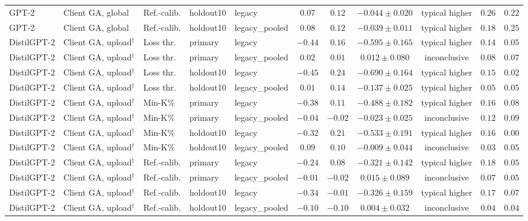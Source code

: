 \begin{table}[t]
\begin{tabular*}{\textwidth}{@{\extracolsep{\fill}}lllllcccccc@{}}
GPT-2 & Client GA, global & Ref.-calib. & holdout10 & legacy & $0.07$ & $0.12$ & $-0.044 \pm 0.020$ & typical higher & $0.26$ & $0.22$ \\
GPT-2 & Client GA, global & Ref.-calib. & holdout10 & legacy\_pooled & $0.08$ & $0.12$ & $-0.039 \pm 0.011$ & typical higher & $0.18$ & $0.25$ \\
DistilGPT-2 & Client GA, upload$^{\dagger}$ & Loss thr. & primary & legacy & $-0.44$ & $0.16$ & $-0.595 \pm 0.165$ & typical higher & $0.14$ & $0.05$ \\
DistilGPT-2 & Client GA, upload$^{\dagger}$ & Loss thr. & primary & legacy\_pooled & $0.02$ & $0.01$ & $0.012 \pm 0.080$ & inconclusive & $0.08$ & $0.07$ \\
DistilGPT-2 & Client GA, upload$^{\dagger}$ & Loss thr. & holdout10 & legacy & $-0.45$ & $0.24$ & $-0.690 \pm 0.164$ & typical higher & $0.15$ & $0.02$ \\
DistilGPT-2 & Client GA, upload$^{\dagger}$ & Loss thr. & holdout10 & legacy\_pooled & $0.01$ & $0.14$ & $-0.137 \pm 0.025$ & typical higher & $0.05$ & $0.05$ \\
DistilGPT-2 & Client GA, upload$^{\dagger}$ & Min-K\% & primary & legacy & $-0.38$ & $0.11$ & $-0.488 \pm 0.182$ & typical higher & $0.16$ & $0.08$ \\
DistilGPT-2 & Client GA, upload$^{\dagger}$ & Min-K\% & primary & legacy\_pooled & $-0.04$ & $-0.02$ & $-0.023 \pm 0.025$ & inconclusive & $0.12$ & $0.09$ \\
DistilGPT-2 & Client GA, upload$^{\dagger}$ & Min-K\% & holdout10 & legacy & $-0.32$ & $0.21$ & $-0.533 \pm 0.191$ & typical higher & $0.16$ & $0.00$ \\
DistilGPT-2 & Client GA, upload$^{\dagger}$ & Min-K\% & holdout10 & legacy\_pooled & $0.09$ & $0.10$ & $-0.009 \pm 0.044$ & inconclusive & $0.03$ & $0.05$ \\
DistilGPT-2 & Client GA, upload$^{\dagger}$ & Ref.-calib. & primary & legacy & $-0.24$ & $0.08$ & $-0.321 \pm 0.142$ & typical higher & $0.18$ & $0.05$ \\
DistilGPT-2 & Client GA, upload$^{\dagger}$ & Ref.-calib. & primary & legacy\_pooled & $-0.01$ & $-0.02$ & $0.015 \pm 0.089$ & inconclusive & $0.07$ & $0.05$ \\
DistilGPT-2 & Client GA, upload$^{\dagger}$ & Ref.-calib. & holdout10 & legacy & $-0.34$ & $-0.01$ & $-0.326 \pm 0.159$ & typical higher & $0.17$ & $0.07$ \\
DistilGPT-2 & Client GA, upload$^{\dagger}$ & Ref.-calib. & holdout10 & legacy\_pooled & $-0.10$ & $-0.10$ & $0.004 \pm 0.032$ & inconclusive & $0.04$ & $0.04$ \\

\end{tabular*}
\end{table}

